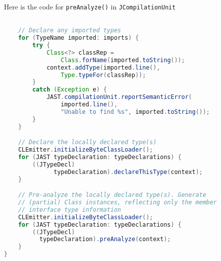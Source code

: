 \documentclass[8pt,a4paper,compress]{beamer}
\begin{document}
\begin{frame}[fragile]
\pause

Here is the code for \lstinline{preAnalyze()} in \lstinline{JCompilationUnit}
\begin{lstlisting}[language=Java]

    // Declare any imported types
    for (TypeName imported: imports) {
        try {
            Class<?> classRep =
                Class.forName(imported.toString());
            context.addType(imported.line(),
                Type.typeFor(classRep));
        }
        catch (Exception e) {
            JAST.compilationUnit.reportSemanticError(
                imported.line(),
                "Unable to find %s", imported.toString());                      
        }
    }

    // Declare the locally declared type(s)
    CLEmitter.initializeByteClassLoader();
    for (JAST typeDeclaration: typeDeclarations) {
        ((JTypeDecl)
              typeDeclaration).declareThisType(context);
    }

    // Pre-analyze the locally declared type(s). Generate
    // (partial) Class instances, reflecting only the member
    // interface type information
    CLEmitter.initializeByteClassLoader();
    for (JAST typeDeclaration: typeDeclarations) {
        ((JTypeDecl)
          typeDeclaration).preAnalyze(context);
    }
}
\end{lstlisting}
\end{frame}
\end{document}
